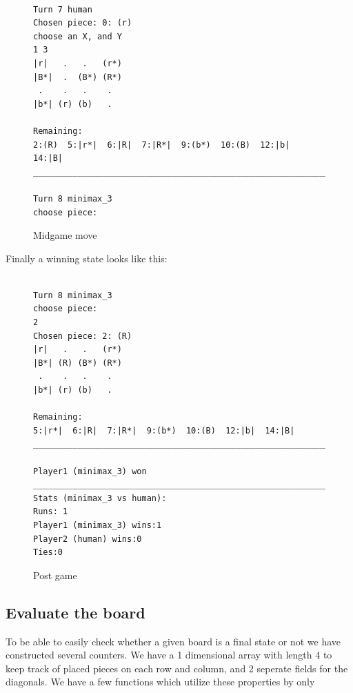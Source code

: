 \documentclass[12pt, a4paper]{article}
\begin{document}
\begin{figure}[H]
\begin{verbatim}

Turn 7 human
Chosen piece: 0: (r)
choose an X, and Y
1 3
|r|   .   .   (r*)
|B*|  .  (B*) (R*)
 .    .   .    . 
|b*| (r) (b)   . 

Remaining:
2:(R)  5:|r*|  6:|R|  7:|R*|  9:(b*)  10:(B)  12:|b|  14:|B|  
____________________________________________________________

Turn 8 minimax_3
choose piece:
\end{verbatim}
\caption{Midgame move}
\label{figure2}
\end{figure}
\noindent
Finally a winning state looks like this:\\
\begin{figure}[H]
\begin{verbatim}

Turn 8 minimax_3
choose piece:
2
Chosen piece: 2: (R)
|r|   .   .   (r*)
|B*| (R) (B*) (R*)
 .    .   .    . 
|b*| (r) (b)   . 

Remaining:
5:|r*|  6:|R|  7:|R*|  9:(b*)  10:(B)  12:|b|  14:|B|  
____________________________________________________________

Player1 (minimax_3) won
____________________________________________________________
Stats (minimax_3 vs human):
Runs: 1
Player1 (minimax_3) wins:1
Player2 (human) wins:0
Ties:0

\end{verbatim}
\caption{Post game}
\label{figure3}
\end{figure}

\subsection{Evaluate the board}
To be able to easily check whether a given board is a final state or not we have constructed several counters. We have a 1 dimensional array with length 4 to keep track of placed pieces on each row and column, and 2 seperate fields for the diagonals. We have a few functions which utilize these properties by only 
\end{document}
